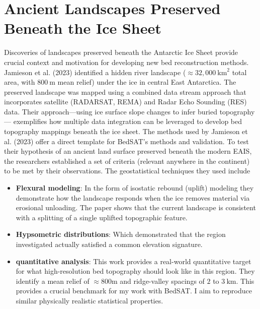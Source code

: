 \section{Ancient Landscapes Preserved Beneath the Ice Sheet}\label{Ancient_River}
Discoveries of landscapes preserved beneath the Antarctic Ice Sheet provide crucial context and motivation for developing new bed reconstruction methods. Jamieson et al. (2023) identified a hidden river landscape ($\approx32,000~\mathrm{km}^{2}$ total area, with $800~\mathrm{m}$ mean relief) under the ice in central East Antarctica. The preserved landscape was mapped using a combined data stream approach that incorporates satellite (RADARSAT, REMA) and Radar Echo Sounding (RES) data. Their approach—using ice surface slope changes to infer buried topography— exemplifies how multiple data integration can be leveraged to develop bed topography mappings beneath the ice sheet. 
The methods used by Jamieson et al. (2023) offer a direct template for BedSAT's methods and validation. To test their hypothesis of an ancient land surface preserved beneath the modern EAIS, the researchers established a set of criteria (relevant anywhere in the continent) to be met by their observations. The geostatistical techniques they used include
\begin{itemize}
\item{\textbf{Flexural modeling}}: In the form of isostatic rebound (uplift) modeling they demonstrate how the landscape responds when the ice removes material via erosional unloading. The paper shows that the current landscape is consistent with a splitting of a single uplifted topographic feature. 
\item{\textbf{Hypsometric distributions}}: Which demonstrated that the region investigated actually satisfied a common elevation signature. 
\item{\textbf{quantitative analysis}}: This work provides a real-world quantitative target for what high-resolution bed topography should look like in this region. They identify a mean relief of $\approx 800\mathrm{m}$ and ridge-valley spacings of $2$ to $3~\mathrm{km}$. This provides a crucial benchmark for my work with BedSAT. I aim to reproduce similar physically realistic statistical properties. 
\end{itemize}
